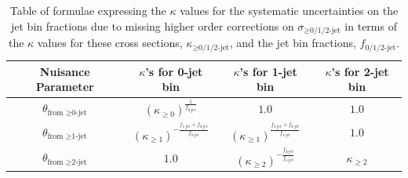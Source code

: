 \begin{table}[!htbp]
\begin{center}
\vspace{0.5cm} 
\caption{Table of formulae expressing the $\kappa$ values for the systematic uncertainties on the
jet bin fractions due to missing higher order corrections on 
$\sigma_{\ge\textrm{0/1/2-jet}}$
in terms of the $\kappa$ values for these cross sections, 
$\kappa_{\ge\textrm{0/1/2-jet}}$, and the jet bin fractions, 
$f_{\textrm{0/1/2-jet}}$.}
\vspace{0.5cm} 
\begin{tabular}{c|ccc}
\hline
Nuisance Parameter & $\kappa$'s for 0-jet bin   & $\kappa$'s for 1-jet bin  & $\kappa$'s for 2-jet bin                       \\
\hline \hline
$\theta_{\textrm{from } \ge \textrm{0-jet}}$  & $ (\kappa_{\geq 0})^{\frac{1}{f_\textrm{0-jet}}}$    & $1.0$ & $1.0$                                            \\
$\theta_{\textrm{from } \ge \textrm{1-jet}}$  & $(\kappa_{\geq 1})^{- \frac{f_\textrm{1-jet}+f_\textrm{2-jet}}{f_\textrm{0-jet}}}$ & $(\kappa_{\geq 1})^{\frac{f_\textrm{1-jet}+f_\textrm{2-jet}}{f_\textrm{1-jet}}}$  & $1.0$                                            \\
$\theta_{\textrm{from } \ge \textrm{2-jet}}$  & $1.0$ & $(\kappa_{\geq 2})^{- \frac{f_\textrm{2-jet}}{f_\textrm{1-jet}}} $     & $\kappa_{\geq 2}$ \\
\hline

\end{tabular}
\label{tab:jetbinformula}
\end{center}
\end{table}

